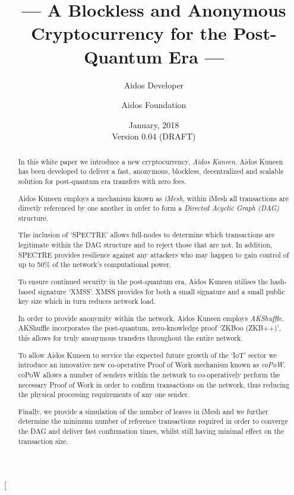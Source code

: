\documentclass[a4paper,10pt,twocolumn]{article}
\title{--- A Blockless and Anonymous Cryptocurrency for the Post-Quantum Era ---}
\author{
		Aidos Developer \and Aidos Foundation
	}
\date{January, 2018 \\ Version 0.04 (DRAFT)}
\begin{document}
	
	\twocolumn[
		\maketitle
	
	\begin{abstract}
			In this white paper we introduce a new cryptocurrency, \emph{Aidos Kuneen}. Aidos Kuneen has been developed to deliver 
			a fast, anonymous, blockless, decentralized and scalable solution for post-quantum era transfers with zero fees. 
	
	\vspace{2.5mm}
			
			Aidos Kuneen employs a mechanism known as \emph{iMesh}, within iMesh all transactions are directly referenced by
			one another in order to form a \emph{Directed Acyclic Graph (DAG)} structure.
	
	\vspace{2.5mm}
			
			The inclusion of `SPECTRE' allows full-nodes to determine which transactions are legitimate within the DAG structure 
			and to reject those that are not. In addition, SPECTRE provides resilience against any attackers who may happen to gain 
			control of up to 50\% of the network's computational power.
	
	\vspace{2.5mm}
			
			To ensure continued security in the post-quantum era, Aidos Kuneen utilises the hash-based signature `XMSS'. XMSS
			provides for both a small signature and a small public key size which in turn reduces network load.
	
	\vspace{2.5mm}
		
			In order to provide anonymity within the network, Aidos Kuneen employs \emph{AKShuffle}. AKShuffle 	
			incorporates the post-quantum, zero-knowledge proof `ZKBoo (ZKB++)', this allows for truly anonymous transfers 
			throughout the entire network.
	
	\vspace{2.5mm}
			
			To allow Aidos Kuneen to service the expected future growth of the `IoT' sector we introduce an innovative new 
			co-operative Proof of Work mechanism known as \emph{coPoW}\@. coPoW allows a number of senders within the network to 
			co-operatively perform the necessary Proof of Work in order to confirm transactions on the network, thus reducing 
			the physical processing requirements of any one sender.
	
	\vspace{2.5mm}
	
			Finally, we provide a simulation of the number of leaves in iMesh and we further determine the minimum number of 
			reference transactions required in order to converge the DAG and deliver fast confirmation times, whilst still having minimal effect on the transaction size.
			
			\end{abstract}
	
\end{document}
